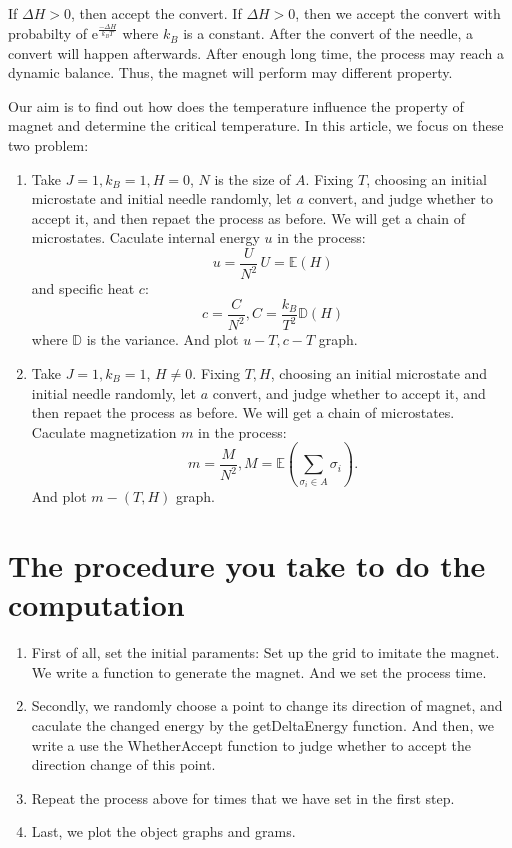 \documentclass[11pt,openany]{book}              %
\begin{document}
If \(\Delta H>0\), then accept the convert. If \(\Delta H > 0 \), then we accept the convert with
probabilty of \(\mathrm{e}^{\frac{- \Delta H}{k_BT}}\) where \(k_{B}\) is a constant.
After the convert of the needle, a convert will happen afterwards. After enough long time,
the process may reach a dynamic balance. Thus, the magnet will perform may different property.

Our aim is to find out how does the temperature influence the property of magnet and determine 
the critical temperature. In this article, we focus on these two problem:
\begin{enumerate}
  
  \item Take \(J=1, k_B=1, H=0\), \(N\) is the size of \(A\). Fixing \(T\), 
    choosing an initial microstate and initial needle randomly, 
    let \(a\) convert, and judge whether to accept it, and then repaet the process as before.
    We will get a chain of microstates.
    Caculate internal energy \(u\) in the process:
    \begin{equation}
    \, u=\frac{U}{N^2}    \, U=\mathbb{E}(H)
    \end{equation}
    and specific heat \(c\):
    \begin{equation}
    \, c=\frac{C}{N^2}, C=\frac{k_B}{T^2} \mathbb{D}(H)
    \end{equation}
    where \(\mathbb{D}\) is the variance.
    And plot \(u-T, c-T\) graph.
  \item Take \(J=1, k_B=1\), \(H \neq 0\). Fixing \(T, H\), 
    choosing an initial microstate and initial needle randomly, 
    let \(a\) convert, and judge whether to accept it, and then repaet the process as before.
    We will get a chain of microstates.
    Caculate magnetization \(m\) in the process:
    \begin{equation}
    \, m=\frac{M}{N^2}, M=\mathbb{E}(\sum_{\sigma_i \in A} \sigma_i ).
    \end{equation}
    And plot \(m-(T, H)\) graph.
\end{enumerate}



\section{The procedure you take to do the computation }
\begin{enumerate}
  \item First of all, set the initial paraments: Set up 
    the grid to imitate the magnet. We write a function 
    to generate the magnet. And we set the process time.
  \item Secondly, we randomly choose a point to change 
    its direction of magnet, and caculate the changed energy
    by the getDeltaEnergy function. And then, we write a 
    use the WhetherAccept function to judge whether to accept 
    the direction change of this point.
  \item Repeat the process above for times that we have set
    in the first step.
  \item Last, we plot the object graphs and grams.
\end{enumerate}
\end{document}
